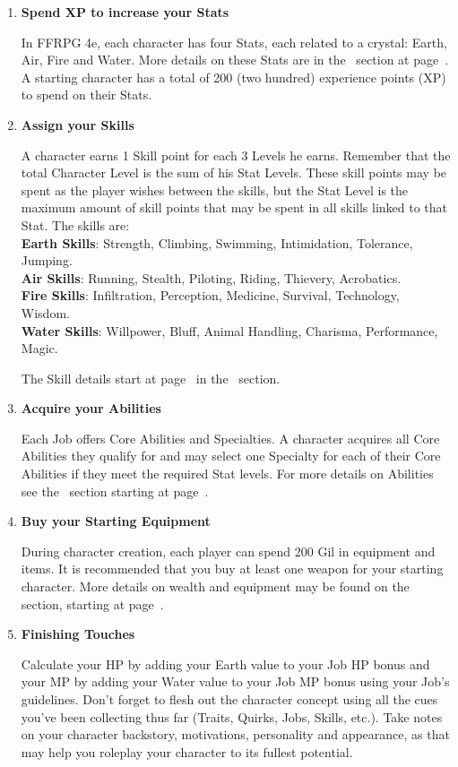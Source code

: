 \begin{multicols}{2}
\begin{enumerate}
\item \textbf{Spend XP to increase your Stats}

In FFRPG 4e, each character has four Stats, each related to a crystal: Earth, Air, Fire and Water. More details on these Stats are in the~ section at page~\pageref{subsec:stats}. A starting character has a total of 200 (two hundred) experience points (XP) to spend on their Stats. 

\item \textbf{Assign your Skills}

A character earns 1 Skill point for each 3 Levels he earns. Remember that the total Character Level is the sum of his Stat Levels. These skill points may be spent as the player wishes between the skills, but the Stat Level is the maximum amount of skill points that may be spent in all skills linked to that Stat. The skills are: \\
\textbf{Earth Skills}: Strength, Climbing, Swimming, Intimidation, Tolerance, Jumping. \\
\textbf{Air Skills}: Running, Stealth, Piloting, Riding, Thievery, Acrobatics. \\
\textbf{Fire Skills}: Infiltration, Perception, Medicine, Survival, Technology, Wisdom. \\
\textbf{Water Skills}: Willpower, Bluff, Animal Handling, Charisma, Performance, Magic.

The Skill details start at page~\pageref{subsec:skills} in the~ section.

\item \textbf{Acquire your Abilities}

Each Job offers Core Abilities and Specialties. A character acquires all Core Abilities they qualify for and may select one Specialty for each of their Core Abilities if they meet the required Stat levels. For more details on Abilities see the~ section starting at page~\pageref{sec:jobs-summary}. 

\item \textbf{Buy your Starting Equipment}

During character creation, each player can spend 200 Gil in equipment and items. It is recommended that you buy at least one weapon for your starting character. More details on wealth and equipment may be found on the~ section, starting at page~\pageref{sec:inv-wealth}.

\item \textbf{Finishing Touches}

Calculate your HP by adding your Earth value to your Job HP bonus and your MP by adding your Water value to your Job MP bonus using your Job's guidelines. Don't forget to flesh out the character concept using all the cues you've been collecting thus far (Traits, Quirks, Jobs, Skills, etc.). Take notes on your character backstory, motivations, personality and appearance, as that may help you roleplay your character to its fullest potential.

\end{enumerate}
\end{multicols}
